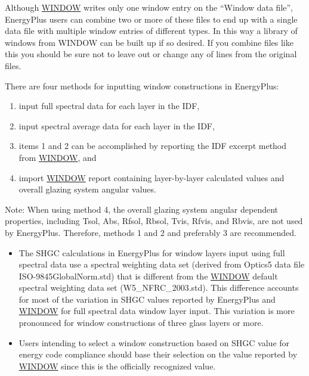 Although \href{https://windows.lbl.gov/software-tools#window-heading}{WINDOW} writes only one window entry on the ``Window data file'', EnergyPlus users can combine two or more of these files to end up with a single data file with multiple window entries of different types. In this way a library of windows from WINDOW can be built up if so desired. If you combine files like this you should be sure not to leave out or change any of lines from the original files.

There are four methods for inputting window constructions in EnergyPlus:

\begin{enumerate}
\tightlist
\item
  input full spectral data for each layer in the IDF,
\item
  input spectral average data for each layer in the IDF,
\item
  items 1 and 2 can be accomplished by reporting the IDF excerpt method from \href{https://windows.lbl.gov/software-tools#window-heading}{WINDOW}, and
\item
  import \href{https://windows.lbl.gov/software-tools#window-heading}{WINDOW} report containing layer-by-layer calculated values and overall glazing system angular values.
\end{enumerate}

\begin{callout}
  Note: When using method 4, the overall glazing system angular dependent properties, including Tsol, Abs, Rfsol, Rbsol, Tvis, Rfvis, and Rbvis, are not used by EnergyPlus. Therefore, methods 1 and 2 and preferably 3 are recommended.
\end{callout}

\begin{itemize}
\item
  The SHGC calculations in EnergyPlus for window layers input using full spectral data use a spectral weighting data set (derived from Optics5 data file ISO-9845GlobalNorm.std) that is different from the \href{https://windows.lbl.gov/software-tools#window-heading}{WINDOW} default spectral weighting data set (W5\_NFRC\_2003.std). This difference accounts for most of the variation in SHGC values reported by EnergyPlus and \href{https://windows.lbl.gov/software-tools#window-heading}{WINDOW} for full spectral data window layer input. This variation is more pronounced for window constructions of three glass layers or more.
\item
  Users intending to select a window construction based on SHGC value for energy code compliance should base their selection on the value reported by \href{https://windows.lbl.gov/software-tools#window-heading}{WINDOW} since this is the officially recognized value.
\end{itemize}

